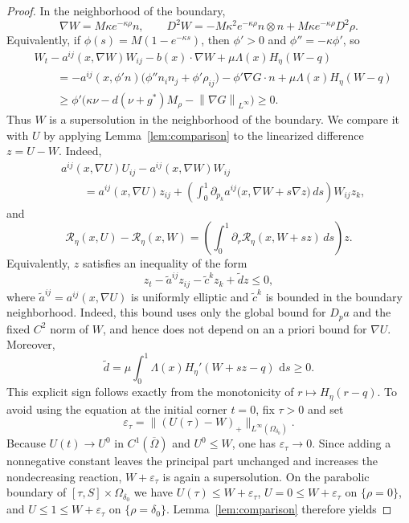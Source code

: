 \documentclass[10pt,a4paper]{amsart}
\newcommand{\cT}{\mathcal{R}}
\newcommand{\dd}{\,\mathrm{d}}
\newcommand{\norm}[1]{\left\lVert #1\right\rVert}
\newcommand{\nupar}{\nu}
\begin{document}
\begin{proof}
In the neighborhood of the boundary,
\[
        \nabla W=M\kappa e^{-\kappa\rho}n,
        \qquad
        D^2W=-M\kappa^2 e^{-\kappa\rho} n\otimes n
        +M\kappa e^{-\kappa\rho}D^2\rho.
\]
Equivalently, if $\phi(s)=M(1-e^{-\kappa s})$, then $\phi'>0$ and $\phi''=-\kappa\phi'$, so
\[
\begin{aligned}
        &W_t-a^{ij}(x,\nabla W)W_{ij}-b(x)\cdot\nabla W
        +\mu\Lambda(x)H_\eta(W-q) \\
        &\qquad
        =-a^{ij}(x,\phi'n)\bigl(\phi'' n_i n_j+\phi'\rho_{ij}\bigr)
        -\phi'\nabla G\cdot n
        +\mu\Lambda(x)H_\eta(W-q) \\
        &\qquad
        \ge
        \phi'\bigl(\kappa\nupar-d(\nupar+g^*)M_\rho-\norm{\nabla G}_{L^\infty}\bigr)
        \ge0.
\end{aligned}
\]
Thus $W$ is a supersolution in the neighborhood of the boundary.  We compare it with $U$ by applying Lemma~\ref{lem:comparison} to the linearized difference $z=U-W$.  Indeed,
\[
\begin{aligned}
        &a^{ij}(x,\nabla U)U_{ij}-a^{ij}(x,\nabla W)W_{ij} \\
        &\qquad =a^{ij}(x,\nabla U)z_{ij}
        +\left(\int_0^1 \partial_{p_k}a^{ij}\bigl(x,\nabla W+s\nabla z\bigr)\,ds\right)W_{ij}z_k,
\end{aligned}
\]
and
\[
        \cT_\eta(x,U)-\cT_\eta(x,W)
        =\left(\int_0^1 \partial_r\cT_\eta(x,W+s z)\,ds\right)z .
\]
Equivalently, $z$ satisfies an inequality of the form
\[
        z_t-\tilde a^{ij}z_{ij}-\tilde c^k z_k+\tilde d z\le0,
\]
where $\tilde a^{ij}=a^{ij}(x,\nabla U)$ is uniformly elliptic and $\tilde c^k$ is bounded in the boundary neighborhood.  Indeed, this bound uses only the global bound for $D_pa$ and the fixed $C^2$ norm of $W$, and hence does not depend on an a priori bound for $\nabla U$.  Moreover,
\[
        \tilde d
        =\mu\int_0^1\Lambda(x)H_\eta'(W+s z-q)\,\dd s\ge0.
\]
This explicit sign follows exactly from the monotonicity of $r\mapsto H_\eta(r-q)$.  To avoid using the equation at the initial corner $t=0$, fix $\tau>0$ and set
\[
 \varepsilon_\tau=\bigl\|(U(\tau)-W)_+\bigr\|_{L^\infty(\Omega_{\delta_0})}.
\]
Because $U(t)\to U^0$ in $C^1(\overline\Omega)$ and $U^0\le W$, one has $\varepsilon_\tau\to0$.  Since adding a nonnegative constant leaves the principal part unchanged and increases the nondecreasing reaction, $W+\varepsilon_\tau$ is again a supersolution.  On the parabolic boundary of $[\tau,S]\times\Omega_{\delta_0}$ we have
$U(\tau)\le W+\varepsilon_\tau$, $U=0\le W+\varepsilon_\tau$ on $\{\rho=0\}$, and $U\le1\le W+\varepsilon_\tau$ on $\{\rho=\delta_0\}$.  Lemma~\ref{lem:comparison} therefore yields

\end{proof}
\end{document}
